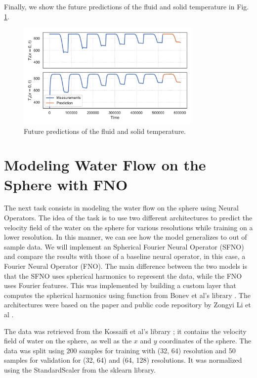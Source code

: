 \documentclass[unicode,11pt,a4paper,oneside,numbers=endperiod,openany]{scrartcl}
\begin{document}
Finally, we show the future predictions of the fluid and solid temperature in
Fig. \ref{fig:future}.
\begin{figure}[ht!]
    \centering
    \includegraphics[width=0.8\textwidth]{../task1/fno/plot_complete.pdf}
    \caption{Future predictions of the fluid and solid temperature.}
    \label{fig:future}
\end{figure}

\section{Modeling Water Flow on the Sphere with FNO}\label{sec:task2}
The next task consists in modeling the water flow on the sphere using Neural Operators.
The idea of the task is to use two different architectures to predict the
velocity field of the water on the sphere for various resolutions while training
on a lower resolution. 
In this manner, we can see how the model generalizes to out of sample data.
We will implement an Spherical
Fourier Neural Operator (SFNO) and compare the results with those of a baseline
neural operator, in this case, a Fourier Neural Operator (FNO).
The main difference between the two models is that the SFNO uses spherical
harmonics to represent the data, while the FNO uses Fourier features. This was
implemented by building a custom layer that computes the spherical harmonics
using function from Bonev et al's library \cite{bonev2023spherical}.
The architectures were based on the paper and public code repository by Zongyi
Li et al \cite{li2020fourier}.

The data was retrieved from the Kossaifi et al's library
\cite{neuraloperator2024sfno}; it contains the velocity
field of water on the sphere, as well as the $x$ and $y$ coordinates of the
sphere.
The data was split using 200 samples for training with (32, 64) resolution and
50 samples for validation for (32, 64) and (64, 128) resolutions. It was
normalized using the StandardScaler from the sklearn library.
\end{document}
